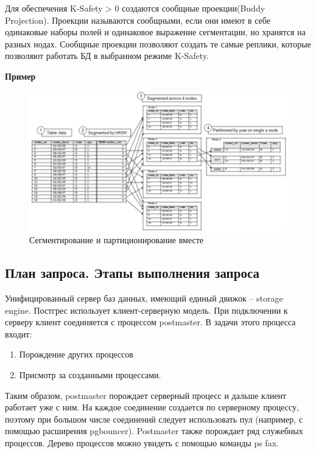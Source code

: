 Для обеспечения K-Safety > 0 создаются сообщные проекции(Buddy Projection). Проекции называются сообщными, если они имеют в себе одинаковые наборы полей и одинаковое выражение сегментации, но хранятся на разных нодах. Сообщные проекции позволяют создать те самые реплики, которые позволяют работать БД в выбранном режиме K-Safety. 

\textbf{Пример}

\begin{figure}[ht!]
	\centering
	\includegraphics[width=18cm, keepaspectratio]{assets/segm.png}
	\caption{Сегментирование и партиционирование вместе} 
\end{figure}
\FloatBarrier

\newpage

\subsection{План запроса. Этапы выполнения запроса}

Унифицированный сервер баз данных, имеющий единый движок – storage
engine. Постгрес использует клиент-серверную модель.
При подключении к серверу клиент соединяется с процессом postmaster. В
задачи этого
процесса входит:

\begin{enumerate}
	\item Порождение других процессов
	\item Присмотр за созданными процессами.
\end{enumerate}

Таким образом, postmaster порождает серверный процесс и дальше клиент
работает уже с ним. На каждое соединение создается по серверному
процессу, поэтому при большом числе соединений следует использовать
пул (например, с помощью расширения pgbouncer). Postmaster также
порождает ряд служебных процессов. Дерево процессов можно увидеть с
помощью команды ps fax.

